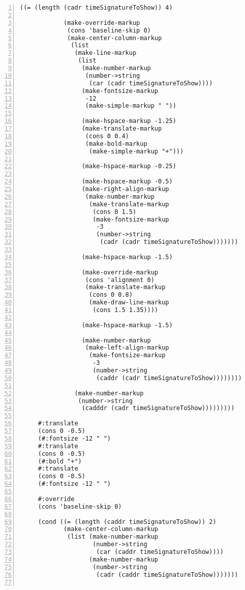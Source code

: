 \begin{Verbatim}[numbers=left,xleftmargin=5mm]
           ((= (length (cadr timeSignatureToShow)) 4)

            (make-override-markup
             (cons 'baseline-skip 0)
             (make-center-column-markup
              (list
               (make-line-markup
                (list
                 (make-number-markup
                  (number->string
                   (car (cadr timeSignatureToShow))))
                 (make-fontsize-markup
                  -12
                  (make-simple-markup " "))

                 (make-hspace-markup -1.25)
                 (make-translate-markup
                  (cons 0 0.4)
                  (make-bold-markup
                   (make-simple-markup "+")))

                 (make-hspace-markup -0.25)

                 (make-hspace-markup -0.5)
                 (make-right-align-markup
                  (make-number-markup
                   (make-translate-markup
                    (cons 0 1.5)
                    (make-fontsize-markup
                     -3
                     (number->string
                      (cadr (cadr timeSignatureToShow)))))))

                 (make-hspace-markup -1.5)

                 (make-override-markup
                  (cons 'alignment 0)
                  (make-translate-markup
                   (cons 0 0.8)
                   (make-draw-line-markup
                    (cons 1.5 1.35))))

                 (make-hspace-markup -1.5)

                 (make-number-markup
                  (make-left-align-markup
                   (make-fontsize-markup
                    -3
                    (number->string
                     (caddr (cadr timeSignatureToShow))))))))

               (make-number-markup
                (number->string
                 (cadddr (cadr timeSignatureToShow)))))))))

     #:translate
     (cons 0 -0.5)
     (#:fontsize -12 " ")
     #:translate
     (cons 0 -0.5)
     (#:bold "+")
     #:translate
     (cons 0 -0.5)
     (#:fontsize -12 " ")

     #:override
     (cons 'baseline-skip 0)

     (cond ((= (length (caddr timeSignatureToShow)) 2)
            (make-center-column-markup
             (list (make-number-markup
                    (number->string
                     (car (caddr timeSignatureToShow))))
                   (make-number-markup
                    (number->string
                     (cadr (caddr timeSignatureToShow)))))))


\end{Verbatim}
